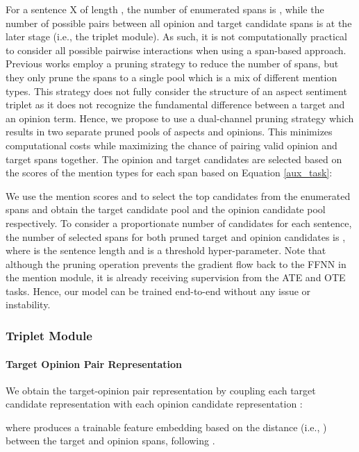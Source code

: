 \documentclass[11pt,a4paper]{article}
\begin{document}
For a sentence X of length , the number of enumerated spans is ,
while the number of possible pairs between all opinion and target candidate spans is  at the later stage (i.e., the triplet module).
As such, it is not computationally practical to consider all possible pairwise interactions when using a span-based approach.
Previous works \cite{luan-etal-2019-general, Wadden2019EntityRA} employ a pruning strategy to reduce the number of spans, but they only prune the spans to a single pool which is a mix of different mention types. 
This strategy does not fully consider the structure of an aspect sentiment triplet as it does not recognize the fundamental difference between a target and an opinion term.
Hence, we propose to use a dual-channel pruning strategy which results in two separate pruned pools of aspects and opinions. This minimizes computational costs while maximizing the chance of pairing valid opinion and target spans together.
The opinion and target candidates are selected based on the scores of the mention types for each span based on Equation \ref{aux_task}: 
 



We use the mention scores  and  
to select the top candidates from the enumerated spans 
and obtain the target candidate pool 
and the opinion candidate pool   respectively.
To consider a proportionate number of candidates for each sentence,
the number of selected spans for both pruned target and opinion candidates is , where  is the sentence length and  is a threshold hyper-parameter.
Note that although the pruning operation 
prevents the gradient flow back to the FFNN in the mention module,
it is already receiving supervision from the ATE and OTE tasks.
Hence, our model can be trained end-to-end without any issue or instability.





\subsubsection{Triplet Module}
\label{triplet_module}
\paragraph{Target Opinion Pair Representation}


We obtain the target-opinion pair representation by coupling each target candidate representation  with each opinion candidate representation :
 
where  produces a trainable feature embedding based on the distance (i.e., ) between the target and opinion spans, following \cite{lee-etal-2017-end, he-etal-2018-jointly,Xu2020PositionAwareTF}.
\end{document}
